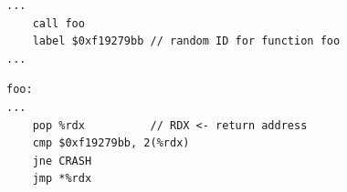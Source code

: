 \documentclass[tikz]{standalone}
\begin{document}
\begin{lrbox}{\simpleRetCheckA}
\begin{lstlisting}[language=myasm,style=smaller]
...
    call foo
    label $0xf19279bb // random ID for function foo
...
\end{lstlisting}
\end{lrbox}
\begin{lrbox}{\simpleRetCheckB}
\begin{lstlisting}[language=myasm,style=smaller]
foo: 
...
    pop %rdx          // RDX <- return address
    cmp $0xf19279bb, 2(%rdx) 
    jne CRASH
    jmp *%rdx
\end{lstlisting}
\end{lrbox}


\end{document}
